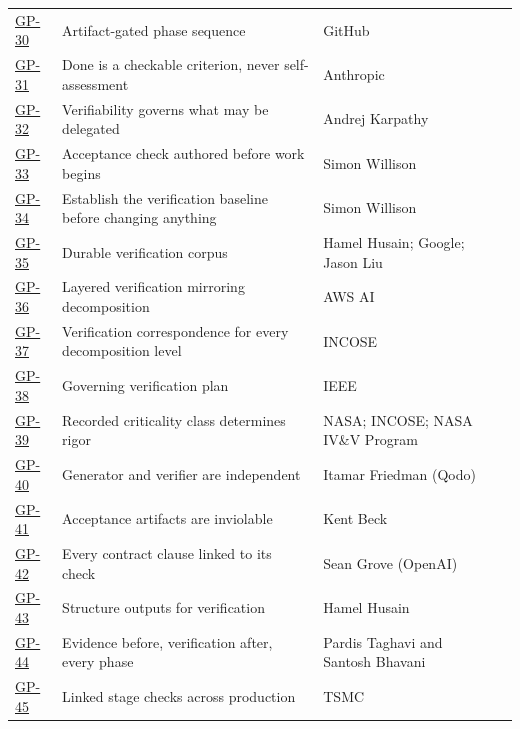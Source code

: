 \begin{longtable}{@{}l p{} p{} p{}@{}}
\hyperlink{gp-30}{GP-30} & Artifact-gated phase sequence & GitHub & \citep{ps-delimarsky-speckit} \\
\hyperlink{gp-31}{GP-31} & Done is a checkable criterion, never self-assessment & Anthropic & \citep{ps-anthropic-bestpractices} \\
\hyperlink{gp-32}{GP-32} & Verifiability governs what may be delegated & Andrej Karpathy & \citep{ps-karpathy-verifiability} \\
\hyperlink{gp-33}{GP-33} & Acceptance check authored before work begins & Simon Willison & \citep{ps-willison-redgreen} \\
\hyperlink{gp-34}{GP-34} & Establish the verification baseline before changing anything & Simon Willison & \citep{ps-willison-firsttests} \\
\hyperlink{gp-35}{GP-35} & Durable verification corpus & Hamel Husain; Google; Jason Liu & \citep{ps-husain-evals,ps-google-agentscli,ps-liu-context} \\
\hyperlink{gp-36}{GP-36} & Layered verification mirroring decomposition & AWS AI & \citep{ps-aws-agentic} \\
\hyperlink{gp-37}{GP-37} & Verification correspondence for every decomposition level & INCOSE & \citep{ps-wayne-vee} \\
\hyperlink{gp-38}{GP-38} & Governing verification plan & IEEE & \citep{ps-futureskill-1012,ps-ansi-1012} \\
\hyperlink{gp-39}{GP-39} & Recorded criticality class determines rigor & NASA; INCOSE; NASA IV\&V Program & \citep{ps-nasa-npr7150,ps-jama-incose,ps-nasa-ivv} \\
\hyperlink{gp-40}{GP-40} & Generator and verifier are independent & Itamar Friedman (Qodo) & \citep{ps-friedman-qodo} \\
\hyperlink{gp-41}{GP-41} & Acceptance artifacts are inviolable & Kent Beck & \citep{ps-beck-augmented,ps-orosz-beck} \\
\hyperlink{gp-42}{GP-42} & Every contract clause linked to its check & Sean Grove (OpenAI) & \citep{ps-grove-newcode} \\
\hyperlink{gp-43}{GP-43} & Structure outputs for verification & Hamel Husain & \citep{ps-husain-evalsmell} \\
\hyperlink{gp-44}{GP-44} & Evidence before, verification after, every phase & Pardis Taghavi and Santosh Bhavani & \citep{ps-taghavi-speckit} \\
\hyperlink{gp-45}{GP-45} & Linked stage checks across production & TSMC & \citep{ps-tsmc-epo,ps-tsmc-ar2014} \\

\end{longtable}
